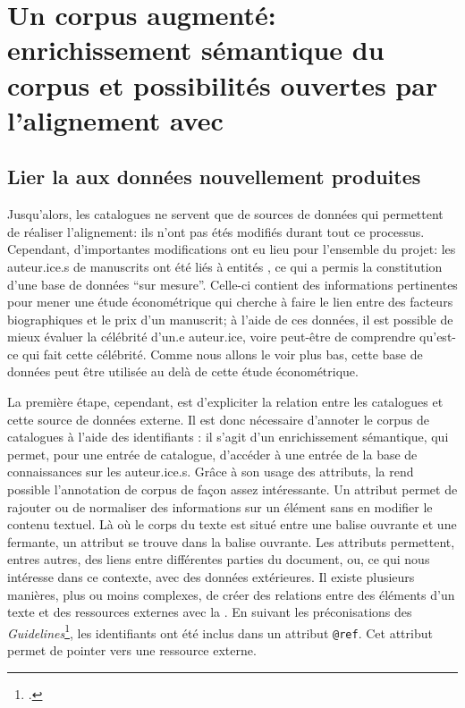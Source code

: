 \chapter{Un corpus augmenté: enrichissement sémantique du corpus et possibilités ouvertes par l'alignement avec \wkd{}}
\section{Lier la \tei{} aux données nouvellement produites}
Jusqu'alors, les catalogues ne servent que de sources de données qui permettent de réaliser l'alignement: ils n'ont pas étés modifiés durant tout ce processus. Cependant, d'importantes modifications ont eu lieu pour l'ensemble du projet: les auteur.ice.s de manuscrits ont été liés à entités \wkd{}, ce qui a permis la constitution d'une base de données \enquote{sur mesure}. Celle-ci contient des informations pertinentes pour mener une étude économétrique qui cherche à faire le lien entre des facteurs biographiques et le prix d'un manuscrit; à l'aide de ces données, il est possible de mieux évaluer la célébrité d'un.e auteur.ice, voire peut-être de comprendre qu'est-ce qui fait cette célébrité. Comme nous allons le voir plus bas, cette base de données peut être utilisée au delà de cette étude économétrique.

La première étape, cependant, est d'expliciter la relation entre les catalogues et cette source de données externe. Il est donc nécessaire d'annoter le corpus de catalogues à l'aide des identifiants \wkd{}: il s'agit d'un enrichissement sémantique, qui permet, pour une entrée de catalogue, d'accéder à une entrée de la base de connaissances sur les auteur.ice.s. Grâce à son usage des attributs, la \tei{} rend possible l'annotation de corpus de façon assez intéressante. Un attribut permet de rajouter ou de normaliser des informations sur un élément sans en modifier le contenu textuel. Là où le corps du texte est situé entre une balise ouvrante et une fermante, un attribut se trouve dans la balise ouvrante. Les attributs permettent, entres autres, des liens entre différentes parties du document, ou, ce qui nous intéresse dans ce contexte, avec des données extérieures. Il existe plusieurs manières, plus ou moins complexes, de créer des relations entre des éléments d'un texte et des ressources externes avec la \tei{}. En suivant les préconisations des \textit{Guidelines}\footcite[16. Linking, Segmentation and Alignment]{tei_consortium_p5_2022}, les identifiants \wkd{} ont été inclus dans un attribut \texttt{@ref}. Cet attribut permet de pointer vers une ressource externe. 

